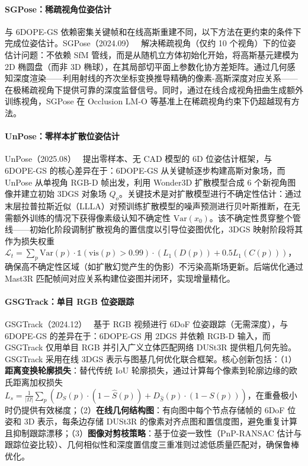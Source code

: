 \paragraph{SGPose：稀疏视角位姿估计} 与 6DOPE-GS 依赖密集关键帧和在线高斯重建不同，以下方法在更约束的条件下完成位姿估计。SGPose（2024.09）~\cite{2409_02581} 解决稀疏视角（仅约 10 个视角）下的位姿估计问题：不依赖 SfM 管线，而是从随机立方体初始化开始，将高斯基元建模为 2D 椭圆盘（而非 3D 椭球），在其局部切平面上参数化协方差矩阵。通过几何感知深度渲染——利用射线的齐次坐标变换推导精确的像素-高斯深度对应关系——在极稀疏视角下提供可靠的深度监督信号。同时，通过在线合成视角扭曲生成额外训练视角，SGPose 在 Occlusion LM-O 等基准上在稀疏视角约束下仍超越现有方法。

\paragraph{UnPose：零样本扩散位姿估计} UnPose（2025.08）~\cite{2508_15972} 提出零样本、无 CAD 模型的 6D 位姿估计框架，与 6DOPE-GS 的核心差异在于：6DOPE-GS 从关键帧逐步构建高斯对象场，而 UnPose 从单视角 RGB-D 帧出发，利用 Wonder3D 扩散模型合成 6 个新视角图像并建立初始 3DGS 对象场 $Q_o$。关键技术是对扩散模型进行不确定性估计：通过末层拉普拉斯近似（LLLA）对预训练扩散模型的噪声预测进行贝叶斯推断，在无需额外训练的情况下获得像素级认知不确定性 $\text{Var}(x_0)$。该不确定性贯穿整个管线——初始化阶段调制扩散视角的置信度以引导位姿图优化，3DGS 映射阶段将其作为损失权重 $\mathcal{L}_t = \sum_p \text{Var}(p) \cdot \mathbb{1}(\text{vis}(p) > 0.99) \cdot (L_1(D(p)) + 0.5 L_1(C(p)))$，确保高不确定性区域（如扩散幻觉产生的伪影）不污染高斯场更新。后端优化通过 Mast3R 匹配帧间对应关系构建位姿图并闭环，实现增量精化。

\paragraph{GSGTrack：单目 RGB 位姿跟踪} GSGTrack（2024.12）~\cite{2412_02267} 基于 RGB 视频进行 6DoF 位姿跟踪（无需深度），与 6DOPE-GS 的差异在于：6DOPE-GS 用 2DGS 并依赖 RGB-D 输入，而 GSGTrack 仅用单目 RGB 并引入广义立体匹配网络 DUSt3R 提供粗几何先验。GSGTrack 采用在线 3DGS 表示与图基几何优化联合框架。核心创新包括：（1）\textbf{距离变换轮廓损失}：替代传统 IoU 轮廓损失，通过计算每个像素到轮廓边缘的欧氏距离加权损失 $L_s = \frac{1}{|\Omega|} \sum_p (D_S(p) \cdot (1-\hat{S}(p)) + D_{\hat{S}}(p) \cdot (1-S(p)))$，在重叠极小时仍提供有效梯度；（2）\textbf{在线几何结构图}：有向图中每个节点存储帧的 6DoF 位姿和 3D 表示，每条边存储 DUSt3R 的像素对齐点图和置信度图，避免重复计算且抑制跟踪漂移；（3）\textbf{图像对剪枝策略}：基于位姿一致性（PnP-RANSAC 估计与跟踪位姿比较）、几何相似性和深度置信度三重准则过滤低质量匹配对，确保鲁棒优化。

